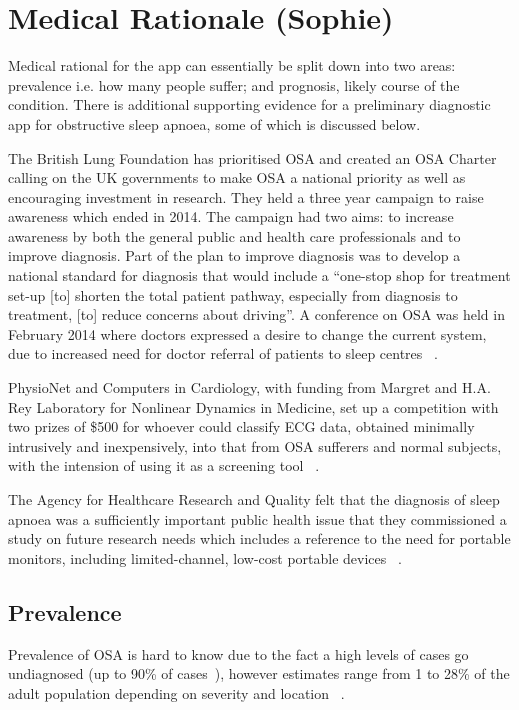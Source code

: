 \section{Medical Rationale (Sophie)}
\label{sec:medicalneed-sophie}
Medical rational for the app can essentially be split down into two areas: prevalence i.e. how many people suffer; and prognosis, likely course of the condition. There is additional supporting evidence for a preliminary diagnostic app for obstructive sleep apnoea, some of which is discussed below.

The British Lung Foundation has prioritised OSA and created an OSA Charter calling on the UK governments to make OSA a national priority as well as encouraging investment in research. They held a three year campaign to raise awareness which ended in 2014. The campaign had two aims: to increase awareness by both the general public and health care professionals and to improve diagnosis. Part of the plan to improve diagnosis was to develop a national standard for diagnosis that would include a ``one-stop shop for treatment set-up [to] shorten the total patient pathway, especially from diagnosis to treatment, [to] reduce concerns about driving''. A conference on OSA was held in February 2014 where doctors expressed a desire to change the current system, due to increased need for doctor referral of patients to sleep centres ~\cite{britishlungfoundation}.

PhysioNet and Computers in Cardiology, with funding from Margret and H.A. Rey Laboratory for Nonlinear Dynamics in Medicine, set up a competition with two prizes of \$500 for whoever could classify ECG data, obtained minimally intrusively and inexpensively, into that from OSA sufferers and normal subjects, with the intension of using it as a screening tool ~\cite{physionet}.

The Agency for Healthcare Research and Quality felt that the diagnosis of sleep apnoea was a sufficiently important public health issue that they commissioned a study on future research needs which includes a reference to the need for portable monitors, including limited-channel, low-cost portable devices ~\cite{balk2012future}.

\subsection{Prevalence}
Prevalence of OSA is hard to know due to the fact a high levels of cases go undiagnosed (up to 90\% of cases~\cite{finkel2009prevalence}), however estimates range from 1 to 28\% of the adult population depending on severity and location ~\cite{young2002epidemiology}.

